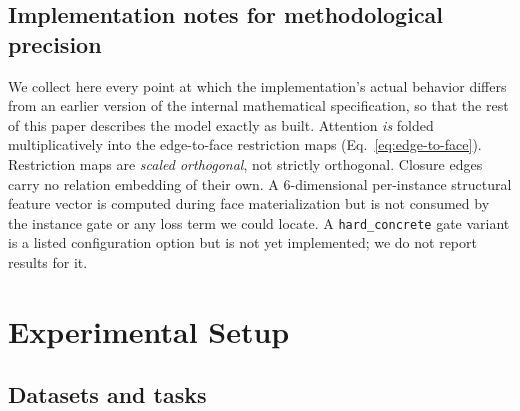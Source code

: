 \documentclass{article}
\begin{document}
\subsection{Implementation notes for methodological precision}

We collect here every point at which the implementation's actual behavior differs from an earlier
version of the internal mathematical specification, so that the rest of this paper describes the
model exactly as built. Attention \emph{is} folded multiplicatively into the edge-to-face
restriction maps (Eq.~\ref{eq:edge-to-face}). Restriction maps are \emph{scaled orthogonal}, not
strictly orthogonal. Closure edges carry no relation embedding of their own. A 6-dimensional
per-instance structural feature vector is computed during face materialization but is not consumed
by the instance gate or any loss term we could locate. A \texttt{hard\_concrete} gate variant is a
listed configuration option but is not yet implemented; we do not report results for it.

\section{Experimental Setup}
\label{sec:exp-setup}

\subsection{Datasets and tasks}

\begin{table}[h]
  \centering
  \caption{Datasets, tasks, and the exact loader verified against the source for each.}
  \label{tab:datasets}
  \small
\end{table}
\end{document}
